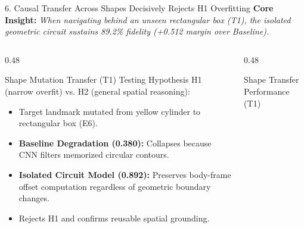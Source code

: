 \documentclass[aspectratio=169, 10pt]{beamer}
\begin{document}
\begin{frame}{6. Causal Transfer Across Shapes Decisively Rejects H1 Overfitting}
  \textbf{Core Insight:} \textit{When navigating behind an unseen rectangular box (T1), the isolated geometric circuit sustains 89.2\% fidelity (+0.512 margin over Baseline).}

  \vspace{0.2cm}
  \begin{columns}[T]
    \begin{column}{0.48\textwidth}
      \begin{block}{Shape Mutation Transfer (T1)}
        \small
        Testing Hypothesis H1 (narrow overfit) vs. H2 (general spatial reasoning):
        \begin{itemize}
          \item Target landmark mutated from yellow cylinder to rectangular box (E6).
          \item \textbf{Baseline Degradation (\alert{0.380}):} Collapses because CNN filters memorized circular contours.
          \item \textbf{Isolated Circuit Model (\textbf{0.892}):} Preserves body-frame offset computation regardless of geometric boundary changes.
          \item Rejects H1 and confirms reusable spatial grounding.
        \end{itemize}
      \end{block}
    \end{column}

    \begin{column}{0.48\textwidth}
      \begin{block}{Shape Transfer Performance (T1)}
        \centering
\end{block}
\end{column}
\end{columns}
\end{frame}
\end{document}
